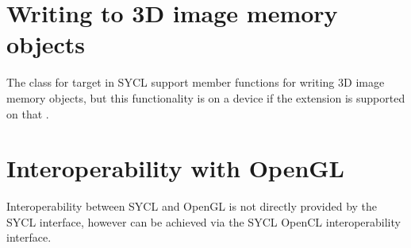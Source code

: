 \section{Writing to 3D image memory objects}

The  class for target
 in SYCL support member functions for writing
3D image memory objects, but this functionality is  on a device if the extension  is
supported on that .

\section{Interoperability with OpenGL}

Interoperability between SYCL and OpenGL is not directly provided by the SYCL interface,
however can be achieved via the SYCL OpenCL interoperability interface.

\clearpage

